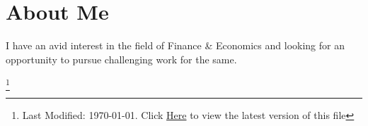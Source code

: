 \documentclass[12pt,a4paper,sans]{moderncv}
\newcommand{\Myinput}[2]{\vspace{#1}{}}
\begin{document}
 	\makecvtitle
 	\vspace{-30pt} %
 	\section{\hspace{10em} About Me}{I have an avid interest in the field of Finance \& Economics and looking for an opportunity to pursue challenging work for the same.}	 %
	
	\Myinput{-10pt}{education-content.tex}        	%
	
	\Myinput{-10pt}{experience-content.tex}        	%

	\Myinput{-10pt}{courses-content.tex}			%
	
	\Myinput{-10pt}{responsibilities-content.tex}	%
	
	\pagebreak
	 
	\Myinput{-10pt}{skill-content.tex}				%
	
	\Myinput{-10pt}{project-content.tex}			%
	
	\Myinput{-10pt}{social-content.tex}				%
	 
 	\let\thefootnote\relax\footnote{Last Modified: \today. Click \href{https://docs.google.com/gview?url=https://raw.githubusercontent.com/Vallabh-Desai/Resume/edel/src/pdf/resume.pdf&embedded=true}{Here} to view the latest version of this file}
	 
 
\end{document}
